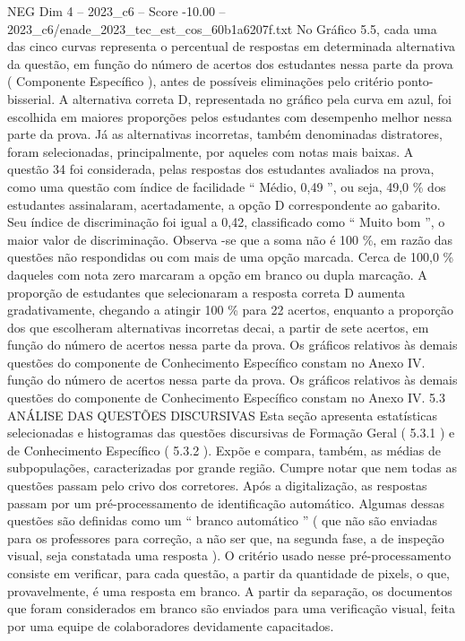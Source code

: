\begin{textsample}{NEG Dim 4 – 2023\_c6 – Score -10.00 – 2023\_c6/enade\_2023\_tec\_est\_cos\_60b1a6207f.txt}
No Gráfico 5.5, cada uma das cinco curvas representa o percentual de respostas em determinada alternativa da questão, em função do número de acertos dos estudantes nessa parte da prova ( Componente Específico ), antes de possíveis eliminações pelo critério ponto-bisserial.
A alternativa correta D, representada no gráfico pela curva em azul, foi escolhida em maiores proporções pelos estudantes com desempenho melhor nessa parte da prova.
Já as alternativas incorretas, também denominadas distratores, foram selecionadas, principalmente, por aqueles com notas mais baixas.
A questão 34 foi considerada, pelas respostas dos estudantes avaliados na prova, como uma questão com índice de facilidade “ Médio, 0,49 ”, ou seja, 49,0 \% dos estudantes assinalaram, acertadamente, a opção D correspondente ao gabarito.
Seu índice de discriminação foi igual a 0,42, classificado como “ Muito bom ”, o maior valor de discriminação.
Observa -se que a soma não é 100 \%, em razão das questões não respondidas ou com mais de uma opção marcada.
Cerca de 100,0 \% daqueles com nota zero marcaram a opção em branco ou dupla marcação.
A proporção de estudantes que selecionaram a resposta correta D aumenta gradativamente, chegando a atingir 100 \% para 22 acertos, enquanto a proporção dos que escolheram alternativas incorretas decai, a partir de sete acertos, em função do número de acertos nessa parte da prova.
Os gráficos relativos às demais questões do componente de Conhecimento Específico constam no Anexo IV. função do número de acertos nessa parte da prova.
Os gráficos relativos às demais questões do componente de Conhecimento Específico constam no Anexo IV. 5.3 ANÁLISE DAS QUESTÕES DISCURSIVAS Esta seção apresenta estatísticas selecionadas e histogramas das questões discursivas de Formação Geral ( 5.3.1 ) e de Conhecimento Específico ( 5.3.2 ).
Expõe e compara, também, as médias de subpopulações, caracterizadas por grande região.
Cumpre notar que nem todas as questões passam pelo crivo dos corretores.
Após a digitalização, as respostas passam por um pré-processamento de identificação automático.
Algumas dessas questões são definidas como um “ branco automático ” ( que não são enviadas para os professores para correção, a não ser que, na segunda fase, a de inspeção visual, seja constatada uma resposta ).
O critério usado nesse pré-processamento consiste em verificar, para cada questão, a partir da quantidade de pixels, o que, provavelmente, é uma resposta em branco.
A partir da separação, os documentos que foram considerados em branco são enviados para uma verificação visual, feita por uma equipe de colaboradores devidamente capacitados.

\end{textsample}
